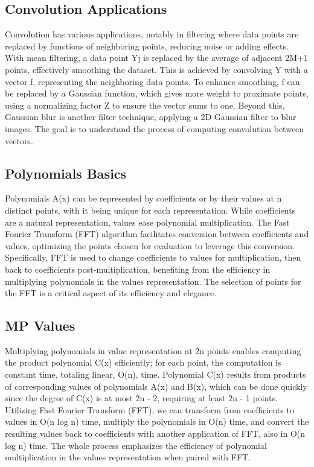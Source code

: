 \subsection*{Convolution Applications}
Convolution has various applications, notably in filtering where data points are replaced by functions of neighboring points, reducing noise or adding effects.
With mean filtering, a data point Yj is replaced by the average of adjacent 2M+1 points, effectively smoothing the dataset.
This is achieved by convolving Y with a vector f, representing the neighboring data points.
To enhance smoothing, f can be replaced by a Gaussian function, which gives more weight to proximate points, using a normalizing factor Z to ensure the vector sums to one.
Beyond this, Gaussian blur is another filter technique, applying a 2D Gaussian filter to blur images.
The goal is to understand the process of computing convolution between vectors.

\subsection*{Polynomials Basics}
Polynomials A(x) can be represented by coefficients or by their values at n distinct points, with it being unique for each representation.
While coefficients are a natural representation, values ease polynomial multiplication.
The Fast Fourier Transform (FFT) algorithm facilitates conversion between coefficients and values, optimizing the points chosen for evaluation to leverage this conversion.
Specifically, FFT is used to change coefficients to values for multiplication, then back to coefficients post-multiplication, benefiting from the efficiency in multiplying polynomials in the values representation.
The selection of points for the FFT is a critical aspect of its efficiency and elegance.

\subsection*{MP  Values}
Multiplying polynomials in value representation at 2n points enables computing the product polynomial C(x) efficiently; for each point, the computation is constant time, totaling linear, O(n), time.
Polynomial C(x) results from products of corresponding values of polynomials A(x) and B(x), which can be done quickly since the degree of C(x) is at most 2n - 2, requiring at least 2n - 1 points.
Utilizing Fast Fourier Transform (FFT), we can transform from coefficients to values in O(n log n) time, multiply the polynomials in O(n) time, and convert the resulting values back to coefficients with another application of FFT, also in O(n log n) time.
The whole process emphasizes the efficiency of polynomial multiplication in the values representation when paired with FFT\@.

